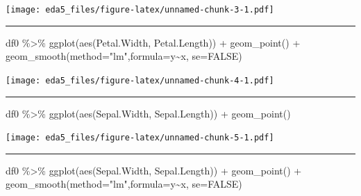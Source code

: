 \documentclass[
]{article}
\newenvironment{Shaded}{\begin{snugshade}}{\end{snugshade}}
\newcommand{\AttributeTok}[1]{\textcolor[rgb]{0.77,0.63,0.00}{#1}}
\newcommand{\ConstantTok}[1]{\textcolor[rgb]{0.00,0.00,0.00}{#1}}
\newcommand{\FunctionTok}[1]{\textcolor[rgb]{0.00,0.00,0.00}{#1}}
\newcommand{\NormalTok}[1]{#1}
\newcommand{\SpecialCharTok}[1]{\textcolor[rgb]{0.00,0.00,0.00}{#1}}
\newcommand{\StringTok}[1]{\textcolor[rgb]{0.31,0.60,0.02}{#1}}
\begin{document}
\texttt{[image: eda5\_files/figure-latex/unnamed-chunk-3-1.pdf]}

\begin{center}\rule{0.5\linewidth}{0.5pt}\end{center}

\begin{Shaded}
\begin{Highlighting}[]
\NormalTok{df0 }\SpecialCharTok{\%\textgreater{}\%} \FunctionTok{ggplot}\NormalTok{(}\FunctionTok{aes}\NormalTok{(Petal.Width, Petal.Length)) }\SpecialCharTok{+} \FunctionTok{geom\_point}\NormalTok{() }\SpecialCharTok{+} \FunctionTok{geom\_smooth}\NormalTok{(}\AttributeTok{method=}\StringTok{"lm"}\NormalTok{,}\AttributeTok{formula=}\NormalTok{y}\SpecialCharTok{\textasciitilde{}}\NormalTok{x, }\AttributeTok{se=}\ConstantTok{FALSE}\NormalTok{)}
\end{Highlighting}
\end{Shaded}

\texttt{[image: eda5\_files/figure-latex/unnamed-chunk-4-1.pdf]}

\begin{center}\rule{0.5\linewidth}{0.5pt}\end{center}

\begin{Shaded}
\begin{Highlighting}[]
\NormalTok{df0 }\SpecialCharTok{\%\textgreater{}\%} \FunctionTok{ggplot}\NormalTok{(}\FunctionTok{aes}\NormalTok{(Sepal.Width, Sepal.Length)) }\SpecialCharTok{+} \FunctionTok{geom\_point}\NormalTok{()}
\end{Highlighting}
\end{Shaded}

\texttt{[image: eda5\_files/figure-latex/unnamed-chunk-5-1.pdf]}

\begin{center}\rule{0.5\linewidth}{0.5pt}\end{center}

\begin{Shaded}
\begin{Highlighting}[]
\NormalTok{df0 }\SpecialCharTok{\%\textgreater{}\%} \FunctionTok{ggplot}\NormalTok{(}\FunctionTok{aes}\NormalTok{(Sepal.Width, Sepal.Length)) }\SpecialCharTok{+} \FunctionTok{geom\_point}\NormalTok{() }\SpecialCharTok{+} \FunctionTok{geom\_smooth}\NormalTok{(}\AttributeTok{method=}\StringTok{"lm"}\NormalTok{,}\AttributeTok{formula=}\NormalTok{y}\SpecialCharTok{\textasciitilde{}}\NormalTok{x, }\AttributeTok{se=}\ConstantTok{FALSE}\NormalTok{)}
\end{Highlighting}
\end{Shaded}
\end{document}

